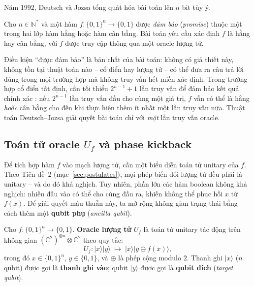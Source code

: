 Năm 1992, Deutsch và Jozsa \cite{ref2} tổng quát hóa bài toán lên $n$ bit tùy ý.

\begin{definition}
\label{def:dj-problem}
Cho $n \in \mathbb{N}^*$ và một hàm $f \colon \{0,1\}^n \to \{0,1\}$ được
\emph{đảm bảo} (\textit{promise}) thuộc một trong hai lớp hàm hằng hoặc hàm cân bằng. Bài toán yêu cầu xác định $f$ là hằng hay cân
bằng, với $f$ được truy cập thông qua một oracle lượng tử.
\end{definition}

\begin{remark}
Điều kiện ``được đảm bảo'' là bản chất của bài toán: không có giả thiết này,
không tồn tại thuật toán nào -- cổ điển hay lượng tử -- có thể đưa ra câu trả
lời đúng trong mọi trường hợp mà không truy vấn hết miền xác định. Trong trường
hợp cổ điển tất định, cần tối thiểu $2^{n-1}+1$ lần truy vấn để đảm bảo kết
quả chính xác \cite{ref5}: nếu $2^{n-1}$ lần truy vấn đầu cho cùng một giá trị,
$f$ vẫn có thể là hằng \emph{hoặc} cân bằng cho đến khi thực hiện thêm ít nhất
một lần truy vấn nữa. Thuật toán Deutsch--Jozsa giải quyết bài toán chỉ với
\emph{một} lần truy vấn oracle.
\end{remark}



\subsection*{Toán tử oracle $U_f$ và phase kickback}

Để tích hợp hàm $f$ vào mạch lượng tử, cần một biểu diễn toán tử unitary của
$f$. Theo Tiên đề~2 (mục~\ref{sec:postulates}), mọi phép biến đổi lượng tử đều
phải là unitary -- và do đó khả nghịch. Tuy nhiên, phần lớn các hàm boolean
không khả nghịch: nhiều đầu vào có thể cho cùng đầu ra, khiến không thể phục hồi
$x$ từ $f(x)$. Để giải quyết mâu thuẫn này, ta mở rộng không gian trạng thái
bằng cách thêm một \textbf{qubit phụ} (\textit{ancilla qubit}).

\begin{definition}
\label{def:oracle}
Cho $f \colon \{0,1\}^n \to \{0,1\}$. \textbf{Oracle lượng tử} $U_f$ là toán
tử unitary tác động trên không gian $(\mathbb{C}^2)^{\otimes n} \otimes
\mathbb{C}^2$ theo quy tắc:
$$U_f \colon |x\rangle|y\rangle \;\longmapsto\; |x\rangle|y \oplus f(x)\rangle,$$
trong đó $x \in \{0,1\}^n$, $y \in \{0,1\}$, và $\oplus$ là phép cộng modulo $2$.
Thanh ghi $|x\rangle$ ($n$ qubit) được gọi là \textbf{thanh ghi vào}; qubit
$|y\rangle$ được gọi là \textbf{qubit đích} (\textit{target qubit}).
\end{definition}


